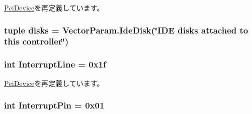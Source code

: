 \hyperlink{classPci_1_1PciDevice_aa90d1ebfb6ac8c64983451e2196e342f}{PciDevice}を再定義しています。\hypertarget{classIde_1_1IdeController_a2c7f0e8eb92ef4c0dd95f088a33fd142}{
\subsubsection[{disks}]{\setlength{\rightskip}{0pt plus 5cm}tuple {\bf disks} = VectorParam.IdeDisk(\char`\"{}IDE {\bf disks} attached to this controller\char`\"{})}}
\label{classIde_1_1IdeController_a2c7f0e8eb92ef4c0dd95f088a33fd142}
\hypertarget{classIde_1_1IdeController_a4c885b3ef4f7d1a88903aabcce7a943e}{
\subsubsection[{InterruptLine}]{\setlength{\rightskip}{0pt plus 5cm}int {\bf InterruptLine} = 0x1f}}
\label{classIde_1_1IdeController_a4c885b3ef4f7d1a88903aabcce7a943e}


\hyperlink{classPci_1_1PciDevice_abfcd311da14374993f51eece70622ee4}{PciDevice}を再定義しています。\hypertarget{classIde_1_1IdeController_a9b18e7e4ee8e0f835496c9106eb519d5}{
\subsubsection[{InterruptPin}]{\setlength{\rightskip}{0pt plus 5cm}int {\bf InterruptPin} = 0x01}}
\label{classIde_1_1IdeController_a9b18e7e4ee8e0f835496c9106eb519d5}


